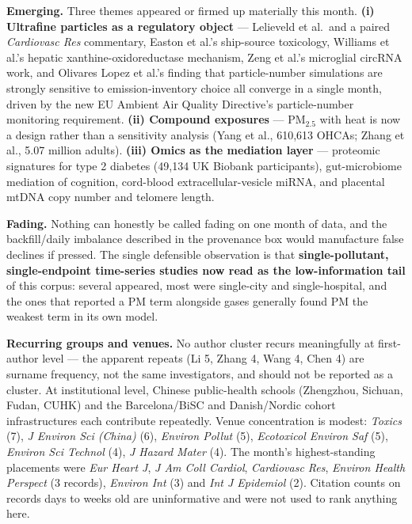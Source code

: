 \documentclass[10pt]{article}
\begin{document}
\footnotesize
\textbf{Emerging.} Three themes appeared or firmed up materially this month.
\textbf{(i) Ultrafine particles as a regulatory object} --- Lelieveld et al.\ and a
paired \textit{Cardiovasc Res} commentary, Easton et al.'s ship-source toxicology,
Williams et al.'s hepatic xanthine-oxidoreductase mechanism, Zeng et al.'s microglial
circRNA work, and Olivares Lopez et al.'s finding that particle-number simulations are
strongly sensitive to emission-inventory choice all converge in a single month, driven by
the new EU Ambient Air Quality Directive's particle-number monitoring requirement.
\textbf{(ii) Compound exposures} --- PM$_{2.5}$ with heat is now a design rather than a
sensitivity analysis (Yang et al., 610{,}613 OHCAs; Zhang et al., 5.07 million adults).
\textbf{(iii) Omics as the mediation layer} --- proteomic signatures for type 2 diabetes
(49{,}134 UK Biobank participants), gut-microbiome mediation of cognition, cord-blood
extracellular-vesicle miRNA, and placental mtDNA copy number and telomere length.

\vspace{2mm}
\textbf{Fading.} Nothing can honestly be called fading on one month of data, and the
backfill/daily imbalance described in the provenance box would manufacture false
declines if pressed. The single defensible observation is that \textbf{single-pollutant,
single-endpoint time-series studies now read as the low-information tail} of this corpus:
several appeared, most were single-city and single-hospital, and the ones that reported a
PM term alongside gases generally found PM the weakest term in its own model.

\vspace{2mm}
\textbf{Recurring groups and venues.} No author cluster recurs meaningfully at
first-author level --- the apparent repeats (Li 5, Zhang 4, Wang 4, Chen 4) are surname
frequency, not the same investigators, and should not be reported as a cluster. At
institutional level, Chinese public-health schools (Zhengzhou, Sichuan, Fudan, CUHK) and
the Barcelona/BiSC and Danish/Nordic cohort infrastructures each contribute repeatedly.
Venue concentration is modest: \textit{Toxics} (7), \textit{J Environ Sci (China)} (6),
\textit{Environ Pollut} (5), \textit{Ecotoxicol Environ Saf} (5), \textit{Environ Sci
Technol} (4), \textit{J Hazard Mater} (4). The month's highest-standing placements were
\textit{Eur Heart J}, \textit{J Am Coll Cardiol}, \textit{Cardiovasc Res},
\textit{Environ Health Perspect} (3 records), \textit{Environ Int} (3) and
\textit{Int J Epidemiol} (2). Citation counts on records days to weeks old are
uninformative and were not used to rank anything here.
\end{document}
